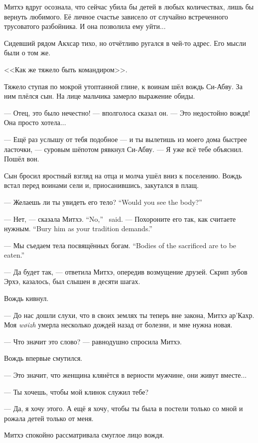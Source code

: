 Митхэ вдруг осознала, что сейчас убила бы детей в любых количествах, лишь бы вернуть любимого.
Её личное счастье зависело от случайно встреченного трусоватого разбойника.
И она позволила ему уйти...

Сидевший рядом Акхсар тихо, но отчётливо ругался в чей-то адрес.
Его мысли были о том же.

<<Как же тяжело быть командиром>>.

Тяжело ступая по мокрой утоптанной глине, к воинам шёл вождь Си-Абву.
За ним плёлся сын.
На лице мальчика замерло выражение обиды.

--- Отец, это было нечестно! --- вполголоса сказал он.
--- Это недостойно вождя!
Она просто хотела...

--- Ещё раз услышу от тебя подобное --- и ты вылетишь из моего дома быстрее ласточки, --- суровым шёпотом рявкнул Си-Абву.
--- Я уже всё тебе объяснил.
Пошёл вон.

Сын бросил яростный взгляд на отца и молча ушёл вниз к поселению.
Вождь встал перед воинами сели и, приосанившись, закутался в плащ.

{--- Желаешь ли ты увидеть его тело?}
{``Would you see the body?''}

{--- Нет, --- сказала Митхэ.}
{``No,'' \Mitchoe\ said.}
{--- Похороните его так, как считаете нужным.}
{``Bury him as your tradition demands.''}

{--- Мы съедаем тела посвящённых богам.}
{``Bodies of the sacrificed are to be eaten.''}

--- Да будет так, --- ответила Митхэ, опередив возмущение друзей.
Скрип зубов Эрхэ, казалось, был слышен в десяти шагах.

Вождь кивнул.

--- До нас дошли слухи, что в своих землях ты теперь вне закона, Митхэ ар’Кахр.
Моя \textit{w\o{}izh} умерла несколько дождей назад от болезни, и мне нужна новая.

--- Что значит это слово? --- равнодушно спросила Митхэ.

Вождь впервые смутился.

--- Это значит, что женщина клянётся в верности мужчине, они живут вместе...

--- Ты хочешь, чтобы мой клинок служил тебе?

--- Да, я хочу этого.
А ещё я хочу, чтобы ты была в постели только со мной и рожала детей только от меня.

Митхэ спокойно рассматривала смуглое лицо вождя.


